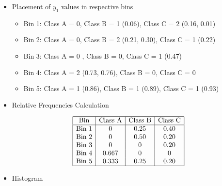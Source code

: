 \documentclass[12pt]{article}
\begin{document}
\begin{enumerate}[leftmargin=\labelsep, label=\textbf{\arabic*.)}]
\begin{itemize}
              \item Placement of $y_1$ values in respective bins

                    \begin{itemize}
                        \item Bin 1: Class A = 0, Class B = 1 (0.06), Class C = 2 (0.16, 0.01)
                        \item Bin 2: Class A = 0, Class B = 2 (0.21, 0.30), Class C = 1 (0.22)
                        \item Bin 3: Class A = 0 , Class B = 0, Class C = 1 (0.47)
                        \item Bin 4: Class A = 2 (0.73, 0.76), Class B = 0, Class C = 0
                        \item Bin 5: Class A = 1 (0.86), Class B = 1 (0.89), Class C = 1 (0.93)
                    \end{itemize}

              \item Relative Frequencies Calculation

                    \[
                        \begin{array}{|c|c|c|c|}
                            \hline
                            \text{Bin}   & \text{Class A} & \text{Class B} & \text{Class C} \\
                            \hline
                            \text{Bin 1} & 0              & 0.25           & 0.40           \\
                            \text{Bin 2} & 0              & 0.50           & 0.20           \\
                            \text{Bin 3} & 0              & 0              & 0.20           \\
                            \text{Bin 4} & 0.667          & 0              & 0              \\
                            \text{Bin 5} & 0.333          & 0.25           & 0.20           \\
                            \hline
                        \end{array}
                    \]

              \item Histogram


\end{itemize}
\end{enumerate}
\end{document}
